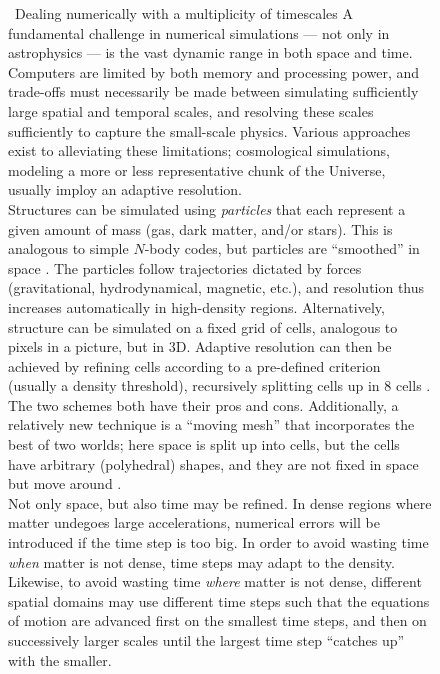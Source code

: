 \documentclass[useAMS]{aa}
\begin{document}
\begin{figure}[!t]
\begin{bclogo}[
    couleur=gray!20,
    epBord=1,
    arrondi=0.1,
    logo=\bcinfo,
    marge=8,
    ombre=false, %
    couleurBord=gray!60,
    barre=line]
    { \ \textsf{Dealing numerically with a multiplicity of timescales}}
    \small{\textsf{A fundamental challenge in numerical simulations --- not only in astrophysics --- is the vast dynamic range in both space and time.
    Computers are limited by both memory and processing power, and trade-offs must necessarily be made between simulating sufficiently large spatial and temporal scales, and resolving these scales sufficiently to capture the small-scale physics.
    Various approaches exist to alleviating these limitations; cosmological simulations, modeling a more or less representative chunk of the Universe, usually imploy an adaptive resolution.\vspace{1mm}\\
    Structures can be simulated using \emph{particles} that each represent a given amount of mass (gas, dark matter, and/or stars).
    This is analogous to simple $N$-body codes, but particles are ``smoothed'' in space \citep{Gingold1977,Lucy1977}.
    The particles follow trajectories dictated by forces (gravitational, hydrodynamical, magnetic, etc.), and resolution thus increases automatically in high-density regions.
    Alternatively, structure can be simulated on a fixed grid of cells, analogous to pixels in a picture, but in 3D.
    Adaptive resolution can then be achieved by refining cells according to a pre-defined criterion (usually a density threshold), recursively splitting cells up in 8 cells \citep{Berger1984,Berger1989}.
    The two schemes both have their pros and cons.
    Additionally, a relatively new technique is a ``moving mesh'' that incorporates the best of two worlds; here space is split up into cells, but the cells have arbitrary (polyhedral) shapes, and they are not fixed in space but move around \citep{Springel2010}.\vspace{1mm}\\
    Not only space, but also time may be refined.
    In dense regions where matter undegoes large accelerations, numerical errors will be introduced if the time step is too big.
    In order to avoid wasting time \emph{when} matter is not dense, time steps may adapt to the density.
    Likewise, to avoid wasting time \emph{where} matter is not dense, different spatial domains may use different time steps such that the equations of motion are advanced first on the smallest time steps, and then on successively larger scales until the largest time step ``catches up'' with the smaller.
    }}
\label{info:adaptive}
\end{bclogo}
     \endminipage
\end{figure}
\end{document}
